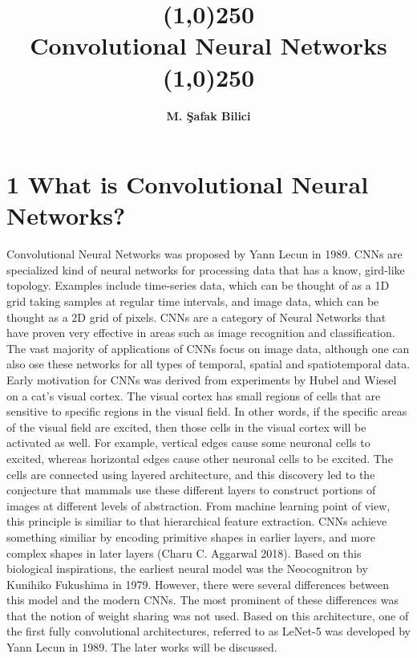 \documentclass[11pt]{article}
\date{}
\begin{document}
\title{\line(1,0){250} \\ \huge{\textbf{Convolutional Neural Networks}} \\\line(1,0){250}}
\author{\textbf{M. Şafak Bilici}}
\maketitle


\section{1 What is Convolutional Neural Networks?}
\hspace*{1cm} Convolutional Neural Networks was proposed by Yann Lecun in 1989. CNNs are specialized kind of neural networks for processing data that has a know, gird-like topology. Examples include time-series data, which can be thought of as a 1D grid taking samples at regular time intervals, and image data, which can be thought as a 2D grid of pixels. CNNs are a category of Neural Networks that have proven very effective in areas such as image recognition and classification. The vast majority of applications of CNNs focus on image data, although one can also ose these networks for all types of temporal, spatial and spatiotemporal data.\cite{GoodBengCour16}\\
Early motivation for CNNs was derived from experiments by Hubel and Wiesel on a cat's visual cortex. The visual cortex has small regions of cells that are sensitive to specific regions in the visual field. In other words, if the specific areas of the visual field are excited, then those cells in the visual cortex will be activated as well. For example, vertical edges cause some neuronal cells to excited, whereas horizontal edges cause other neuronal cells to be excited. The cells are connected using layered architecture, and this discovery led to the conjecture that mammals use these different layers to construct portions of images at different levels of abstraction. From machine learning point of view, this principle is similiar to that hierarchical feature extraction. CNNs achieve something similiar by encoding primitive shapes in earlier layers, and more complex shapes in later layers (Charu C. Aggarwal 2018).
Based on this biological inspirations, the earliest neural model was the Neocognitron by Kunihiko Fukushima in 1979. However, there were several differences between this model and the modern CNNs. The most prominent of these differences was that the notion of weight sharing was not used. Based on this architecture, one of the first fully convolutional architectures, referred to as LeNet-5 was developed by Yann Lecun in 1989. The later works will be discussed. 
\end{document}

